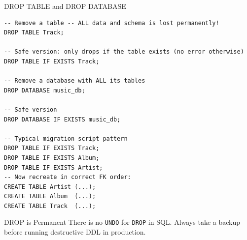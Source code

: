 \begin{frame}[fragile]{DROP TABLE and DROP DATABASE}
  \begin{lstlisting}[style=sqlstyle]
-- Remove a table -- ALL data and schema is lost permanently!
DROP TABLE Track;

-- Safe version: only drops if the table exists (no error otherwise)
DROP TABLE IF EXISTS Track;

-- Remove a database with ALL its tables
DROP DATABASE music_db;

-- Safe version
DROP DATABASE IF EXISTS music_db;

-- Typical migration script pattern
DROP TABLE IF EXISTS Track;
DROP TABLE IF EXISTS Album;
DROP TABLE IF EXISTS Artist;
-- Now recreate in correct FK order:
CREATE TABLE Artist (...);
CREATE TABLE Album  (...);
CREATE TABLE Track  (...);
  \end{lstlisting}

  \begin{alertblock}{DROP is Permanent}
    There is no \texttt{UNDO} for \texttt{DROP} in SQL.
    Always take a backup before running destructive DDL in production.
  \end{alertblock}
\end{frame}
